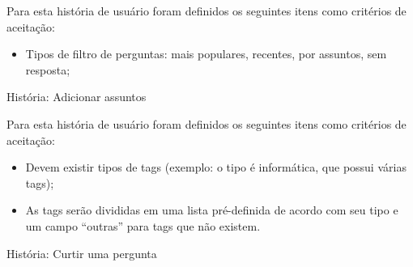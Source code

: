 Para esta história de usuário foram definidos os seguintes itens como critérios de aceitação:

\begin{itemize}
\item Tipos de filtro de perguntas: mais populares, recentes, por assuntos, sem resposta;
\end{itemize}

\def\arraystretch{2}
\begin{quadro}[htb]
\centering
\ABNTEXfontereduzida
\caption[História: Adicionar assuntos]{História: Adicionar assuntos}
\end{quadro}
\FloatBarrier 

Para esta história de usuário foram definidos os seguintes itens como critérios de aceitação:

\begin{itemize}
\item Devem existir tipos de tags (exemplo: o tipo é informática, que possui várias tags);
\item As tags serão divididas em uma lista pré-definida de acordo com seu tipo e um campo “outras” para tags que não existem.
\end{itemize}

\def\arraystretch{2}
\begin{quadro}[htb]
\centering
\ABNTEXfontereduzida
\caption[História: Curtir uma pergunta]{História: Curtir uma pergunta}
\end{quadro}
\FloatBarrier 

